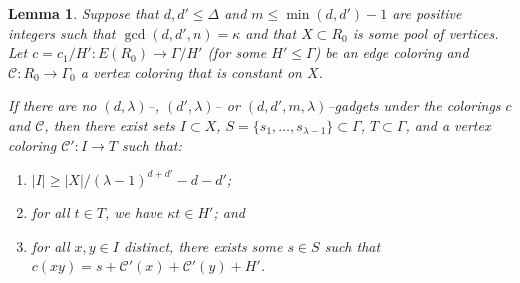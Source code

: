 \documentclass[10pt,a4paper]{amsart}
\newtheorem{lemma}{Lemma}
\newcommand{\cC}{\mathcal{C} }
\begin{document}
\begin{lemma}\label{core_phase_arg}
    Suppose that $d, d'\leq\Delta$ and $m\leq \min(d, d')-1$ are positive integers such that $\gcd(d, d', n)=\kappa$ and that   
    $X\subset R_0$ is some pool of vertices. Let $c=c_1/H':E(R_0)\to \Gamma/H'$ (for some $H'\leqslant \Gamma$) be an edge coloring and $\cC:R_0\to \Gamma_0$ a vertex coloring that is constant on $X$. 
    
    If there are no $(d,\lambda)$--, $(d',\lambda)$-- or $(d,d',m,\lambda)$--gadgets under the colorings $c$ and $\cC$, then there exist sets $I\subset X$, $S=\{s_1,\ldots,s_{\lambda-1}\}\subset \Gamma$, $T\subset \Gamma$, and a vertex coloring $\cC':I\to T$ such that: 
    \begin{enumerate}
        \item $|I|\geq |X|/(\lambda-1)^{d+d'} - d-d'$;
        \item for all $t\in T$, we have $\kappa t \in H'$; and
        \item for all $x,y\in I$ distinct, there exists some $s\in S$ such that $c(xy)=s+\cC'(x)+\cC'(y)+H'$.
    \end{enumerate}  
\end{lemma}
\end{document}
